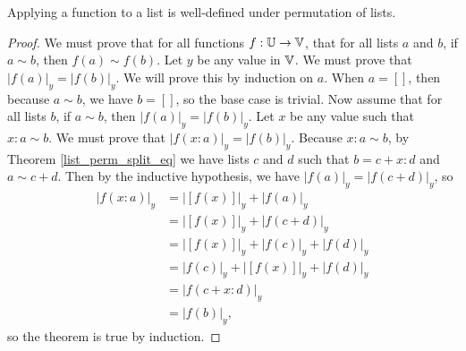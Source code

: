 \documentclass[../../math.tex]{subfiles}
\begin{document}
\begin{lemma}
    Applying a function to a list is well-defined under permutation of lists.
\end{lemma}
\begin{proof}
    We must prove that for all functions $f : \mathbb{U} \to \mathbb{V}$, that for all lists $a$
    and $b$, if $a \sim b$, then $f(a) \sim f(b)$.  Let $y$ be any value in
    $\mathbb{V}$.  We must prove that $|f(a)|_y = |f(b)|_y$.  We will prove this by
    induction on $a$.  When $a = []$, then because $a \sim b$, we have $b = []$,
    so the base case is trivial.  Now assume that for all lists $b$, if $a \sim
    b$, then $|f(a)|_y = |f(b)|_y$.  Let $x$ be any value such that $x : a \sim
    b$.  We must prove that $|f(x : a)|_y = |f(b)|_y$.  Because $x : a \sim b$,
    by Theorem \ref{list_perm_split_eq} we have lists $c$ and $d$ such that $b =
    c + x : d$ and $a \sim c + d$.  Then by the inductive hypothesis, we have
    $|f(a)|_y = |f(c + d)|_y$, so
    \begin{align*}
        |f(x : a)|_y
        &= |[f(x)]|_y + |f(a)|_y \\
        &= |[f(x)]|_y + |f(c + d)|_y \\
        &= |[f(x)]|_y + |f(c)|_y + |f(d)|_y \\
        &= |f(c)|_y + |[f(x)]|_y + |f(d)|_y \\
        &= |f(c + x : d)|_y \\
        &= |f(b)|_y,
    \end{align*}
    so the theorem is true by induction.
\end{proof}
\end{document}
